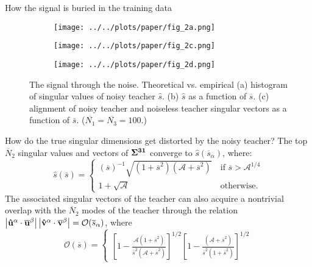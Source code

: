 \documentclass[final]{beamer}
\newcommand{\bb}[1]{{\bf\overline{#1}}}
\newcommand{\bh}[1]{{\bf\hat{#1}}}
\begin{document}
\begin{frame}[t]{}
\begin{columns}
\begin{column}[t]{0.248\textwidth}
\begin{block}{\large How the signal is buried in the training data}
\begin{figure}
\vspace{-0.5em}
\centering
\begin{subfigure}[t]{0.44\textwidth}
\texttt{[image: ../../plots/paper/fig\_2a.png]}
\label{fig2b}
\end{subfigure}%
\begin{subfigure}[t]{0.30\textwidth}
\texttt{[image: ../../plots/paper/fig\_2c.png]}
\label{fig2c}
\end{subfigure}%
\begin{subfigure}[t]{0.21\textwidth}
\texttt{[image: ../../plots/paper/fig\_2d.png]}
\label{fig2d}
\end{subfigure}
\vspace{-1em}
\caption{The signal through the noise. Theoretical vs. empirical (a) histogram of singular values of noisy teacher \(\hat{s}\). (b) \(\hat{s}\) as a function of \(\overline{s}\). (c) alignment of noisy teacher and noiseless teacher singular vectors as a function of \(\overline{s}\). ($\overline{N_1}= \overline{N_3} = 100$.)}
\label{fig2}
\vspace{-0.5em}
\end{figure}
How do the true singular dimensions get distorted by the noisy teacher? The top $\overline{N}_2$ singular values and vectors of $\bf{\Sigma}^{31}$ converge to ${\hat s}(\overline{s}_\alpha)$, where:
\begin{equation}
\hat{s}(\overline{s}) = \begin{cases}
{(\overline{s})^{-1}}{\sqrt{(1+\overline{s}^2)(\mathcal{A}+\overline{s}^2)}}\ & \text{if } \overline{s} > \mathcal{A}^{1/4} \\
1+\sqrt{\mathcal{A}} & \text{otherwise}.
\end{cases}
\label{eq:shatsbar}
\end{equation}
The associated singular vectors of the teacher can also acquire a nontrivial overlap with the $\overline{N}_2$ modes of the teacher through the relation 
$\left\lvert {\bh u}^{\alpha} \cdot \bb{u}^{\beta} \right\rvert   \left\lvert{\bh v}^{\alpha} \cdot \bb{v}^{\beta} \right\rvert = \mathcal{O}(\overline{s}_\alpha)$, where 
\begin{equation}
\mathcal{O}(\overline{s}) = 
\begin{cases}
\left[1-
        \frac{\mathcal{A}(1+\overline{s}^2)}          
            {\overline{s}^2(\mathcal{A}+\overline{s}^2)}
\right]^{1/2} 
\left[1-
        \frac{(\mathcal{A}+\overline{s}^2)}          
            {\overline{s}^2(1+\overline{s}^2)}
\right]^{1/2}


\end{cases}
\end{equation}
\end{block}
\end{column}
\end{columns}
\end{frame}
\end{document}
